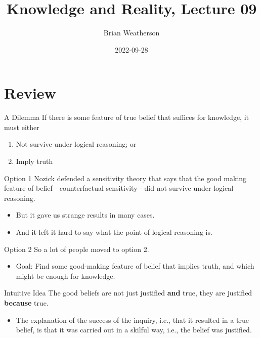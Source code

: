 \documentclass[
  17pt,
  letterpaper,
  ignorenonframetext,
  aspectratio=169,
]{beamer}
\title{Knowledge and Reality, Lecture 09}
\author{Brian Weatherson}
\date{2022-09-28}
\providecommand{\tightlist}{%
  \setlength{\itemsep}{0pt}\setlength{\parskip}{0pt}}\usepackage{longtable,booktabs,array}
\begin{document}
\frame{\titlepage}
\ifdefined\Shaded\renewenvironment{Shaded}{\begin{tcolorbox}[boxrule=0pt, sharp corners, borderline west={3pt}{0pt}{shadecolor}, frame hidden, breakable, interior hidden, enhanced]}{\end{tcolorbox}}\fi

\hypertarget{review}{%
\section{Review}\label{review}}

\begin{frame}{A Dilemma}
\protect\hypertarget{a-dilemma}{}
If there is some feature of true belief that suffices for knowledge, it
must either

\begin{enumerate}[<+->]
\tightlist
\item
  Not survive under logical reasoning; or
\item
  Imply truth
\end{enumerate}
\end{frame}

\begin{frame}{Option 1}
\protect\hypertarget{option-1}{}
Nozick defended a sensitivity theory that says that the good making
feature of belief - counterfactual sensitivity - did not survive under
logical reasoning.

\begin{itemize}[<+->]
\tightlist
\item
  But it gave us strange results in many cases.
\item
  And it left it hard to say what the point of logical reasoning is.
\end{itemize}
\end{frame}

\begin{frame}{Option 2}
\protect\hypertarget{option-2}{}
So a lot of people moved to option 2.

\begin{itemize}[<+->]
\tightlist
\item
  Goal: Find some good-making feature of belief that implies truth, and
  which might be enough for knowledge.
\end{itemize}
\end{frame}

\begin{frame}{Intuitive Idea}
\protect\hypertarget{intuitive-idea}{}
The good beliefs are not just justified \textbf{and} true, they are
justified \textbf{because} true.

\begin{itemize}[<+->]
\tightlist
\item
  The explanation of the success of the inquiry, i.e., that it resulted
  in a true belief, is that it was carried out in a skilful way, i.e.,
  the belief was justified.
\end{itemize}
\end{frame}
\end{document}
